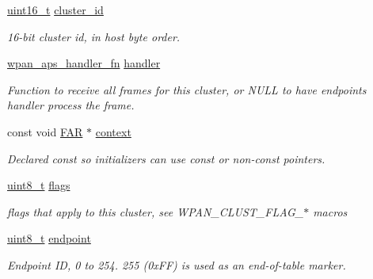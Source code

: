 \begin{DoxyCompactItemize}
\hyperlink{group__hal__dos_ga5a8b2dc9e45a9ee81a94ef304fb62505}{uint16\+\_\+t} \hyperlink{group__wpan__aps_ga262a92f94287e77cb56350951893bae2}{cluster\+\_\+id}
\begin{DoxyCompactList}\small\item\em 16-\/bit cluster id, in host byte order. \end{DoxyCompactList}\item 
\hyperlink{group__wpan__aps_ga8575b0db762a5fbb858d4994c9b657e3}{wpan\+\_\+aps\+\_\+handler\+\_\+fn} \hyperlink{group__wpan__aps_gab0c5e32241c4c2860c728aeab4b6f253}{handler}
\begin{DoxyCompactList}\small\item\em Function to receive all frames for this cluster, or N\+U\+LL to have endpoint\textquotesingle{}s handler process the frame. \end{DoxyCompactList}\item 
const void \hyperlink{group__hal_gaef060b3456fdcc093a7210a762d5f2ed}{F\+AR} $\ast$ \hyperlink{group__wpan__aps_gad58378484a15ab673f5eb1613114330e}{context}
\begin{DoxyCompactList}\small\item\em Declared {\ttfamily const} so initializers can use {\ttfamily const} or non-\/{\ttfamily const} pointers. \end{DoxyCompactList}\item 
\mbox{\label{group__wpan__aps_gaa2585d779da0ab21273a8d92de9a0ebe}} 
\hyperlink{group__hal__dos_gae1affc9ca37cfb624959c866a73f83c2}{uint8\+\_\+t} \hyperlink{group__wpan__aps_gaa2585d779da0ab21273a8d92de9a0ebe}{flags}
\begin{DoxyCompactList}\small\item\em flags that apply to this cluster, see W\+P\+A\+N\+\_\+\+C\+L\+U\+S\+T\+\_\+\+F\+L\+A\+G\+\_\+$\ast$ macros \end{DoxyCompactList}\item 
\mbox{\label{group__wpan__aps_ga7d397493728da2bca8d55b2d61c4ec5d}} 
\hyperlink{group__hal__dos_gae1affc9ca37cfb624959c866a73f83c2}{uint8\+\_\+t} \hyperlink{group__wpan__aps_ga7d397493728da2bca8d55b2d61c4ec5d}{endpoint}
\begin{DoxyCompactList}\small\item\em Endpoint ID, 0 to 254. 255 (0x\+FF) is used as an end-\/of-\/table marker. \end{DoxyCompactList}\item 

\end{DoxyCompactItemize}
